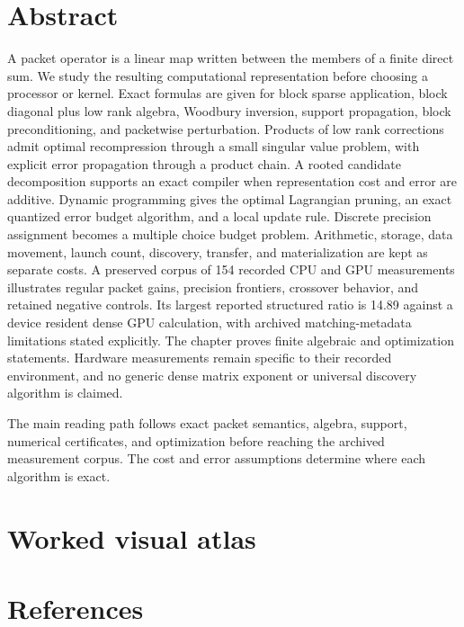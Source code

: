 \documentclass[11pt,letterpaper]{article}
\theoremstyle{definition}
\theoremstyle{remark}
\begin{document}
\section*{Abstract}
A packet operator is a linear map written between the members of a finite direct sum. We study the resulting computational representation before choosing a processor or kernel. Exact formulas are given for block sparse application, block diagonal plus low rank algebra, Woodbury inversion, support propagation, block preconditioning, and packetwise perturbation. Products of low rank corrections admit optimal recompression through a small singular value problem, with explicit error propagation through a product chain. A rooted candidate decomposition supports an exact compiler when representation cost and error are additive. Dynamic programming gives the optimal Lagrangian pruning, an exact quantized error budget algorithm, and a local update rule. Discrete precision assignment becomes a multiple choice budget problem. Arithmetic, storage, data movement, launch count, discovery, transfer, and materialization are kept as separate costs. A preserved corpus of 154 recorded CPU and GPU measurements illustrates regular packet gains, precision frontiers, crossover behavior, and retained negative controls. Its largest reported structured ratio is 14.89 against a device resident dense GPU calculation, with archived matching-metadata limitations stated explicitly. The chapter proves finite algebraic and optimization statements. Hardware measurements remain specific to their recorded environment, and no generic dense matrix exponent or universal discovery algorithm is claimed.
\clearpage

\clearpage
\begin{readerroadmap}[title={The finite manuscript}]
The main reading path follows exact packet semantics, algebra, support, numerical certificates, and optimization before reaching the archived measurement corpus. The cost and error assumptions determine where each algorithm is exact.
\end{readerroadmap}

\clearpage\FloatBarrier
\appendix






\clearpage\FloatBarrier
\section*{Worked visual atlas}

\clearpage\FloatBarrier
\section*{References}
\renewcommand{\refname}{}


\end{document}
